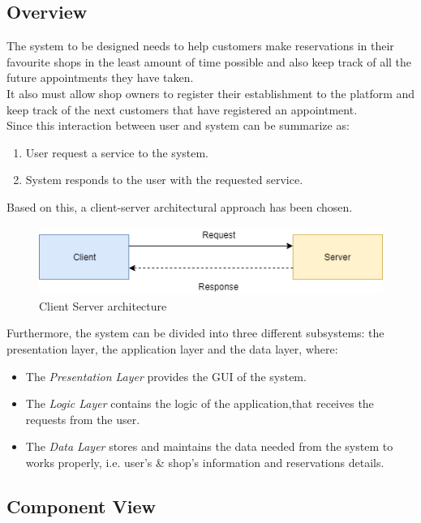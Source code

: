 \subsection{Overview}
The system to be designed needs to help customers make reservations in their favourite shops in the least amount of time possible and also keep track of all the future appointments they have taken.\\
It also must allow shop owners to register their establishment to the platform and keep track of the next customers that have registered an appointment.\\
Since this interaction between user and system can be summarize as:
\begin{enumerate}
	\item User request a service to the system.
	\item System responds to the user with the requested service.
\end{enumerate}
Based on this, a client-server architectural approach has been chosen.
\begin{figure}[H]
	\includegraphics{Img/ClientServerArchitecture}
	\caption{Client Server architecture}
	\label{fig:clientserver}
\end{figure}
Furthermore, the system can be divided into three different subsystems: the presentation layer, the application layer and the data layer, where: 
\begin{itemize}
	\item The \emph{Presentation Layer} provides the GUI of the system.
	\item The \emph{Logic Layer} contains the logic of the application,that receives the requests from the user.
	\item The \emph{Data Layer} stores and maintains the data needed from the system to works properly, i.e. user's \& shop's information and reservations details.
\end{itemize}
\clearpage

\subsection{Component View}


